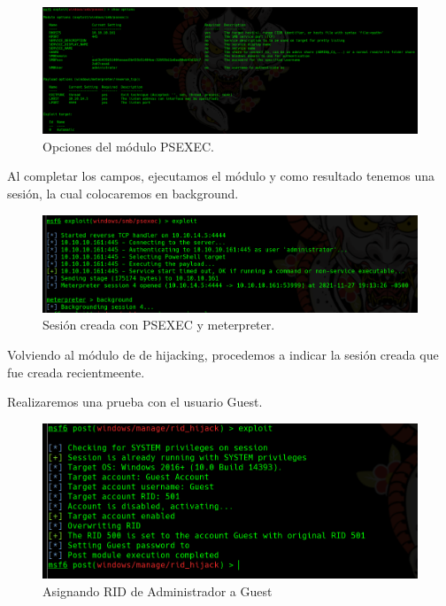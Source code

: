\documentclass{article}
\begin{document}
\begin{figure}[H]
	\center
	\includegraphics[width=\textwidth/2]{images/forest/creando la sesion.png}
	\caption{Opciones del módulo PSEXEC.}
\end{figure}

Al completar los campos, ejecutamos el módulo y como resultado tenemos una sesión, la cual colocaremos en background.

\begin{figure}[H]
	\center
	\includegraphics[width=\textwidth/2]{images/forest/sesion_creada.png}
	\caption{Sesión creada con PSEXEC y meterpreter.}
\end{figure}

Volviendo al módulo de de hijacking, procedemos a indicar la sesión creada que fue creada recientmeente.


Realizaremos una prueba con el usuario Guest.

\begin{figure}[H]
	\center
	\includegraphics[width=\textwidth/2]{images/forest/Gues_como_admin.png}
	\caption{Asignando RID de Administrador a Guest}
\end{figure}
\end{document}
